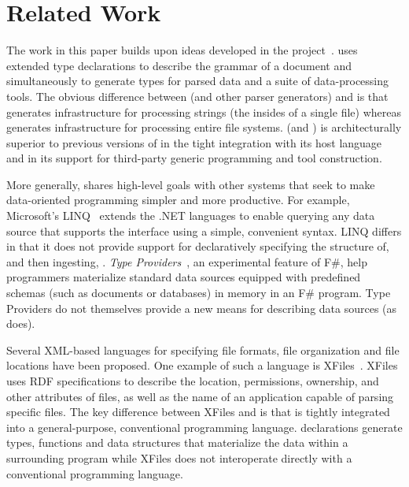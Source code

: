 \section{Related Work}
\label{sec:related}

The work in this paper builds upon ideas developed in the \pads{} 
project~\cite{fisher+:pads,fisher+:toplas}. \pads{} uses extended
type declarations to describe the grammar of a document
and simultaneously to generate types for parsed data and a suite 
of data-processing tools.  The obvious difference between 
\pads{} (and other parser generators) and
\forest{} is that 
\pads{} generates infrastructure for processing strings (the insides
of a single file) whereas \forest{} generates infrastructure for 
processing entire file systems.
\forest{} (and \padshaskell) is architecturally superior to 
previous versions of \pads{} in the tight integration with its host
language and
in its support for third-party generic programming and tool construction.

More generally, \forest{} shares high-level goals with other systems
that seek to make data-oriented programming simpler and more productive.
For example, Microsoft's LINQ~\cite{linq} extends the .NET languages
to enable querying
any data source that supports the  interface using
a simple, convenient syntax.  
LINQ differs in that it does not provide support for
declaratively specifying the structure of, and then ingesting, 
\filestores{}. {\em Type Providers}~\cite{syme+:type-providers}, an
experimental feature 
of F\#, help programmers materialize standard data sources equipped with
predefined schemas (such as \xml{} documents or databases) in memory in
an F\# program.  Type Providers
do not themselves provide a new means for describing data sources (as
\forest{} does). 

Several XML-based languages for specifying file formats, file
organization and file locations have been proposed. One example of
such a language is XFiles~\cite{xml-file-sys}.  XFiles uses RDF
specifications to describe the location, permissions, ownership, and
other attributes of files, as well as the name of an application
capable of parsing specific files.  The key difference between XFiles
and \forest{} is that \forest{} is tightly integrated into a
general-purpose, conventional programming language.  \forest{}
declarations generate types, functions and data structures that
materialize the data within a surrounding \haskell{} program while
XFiles does not interoperate directly with a conventional programming
language.

